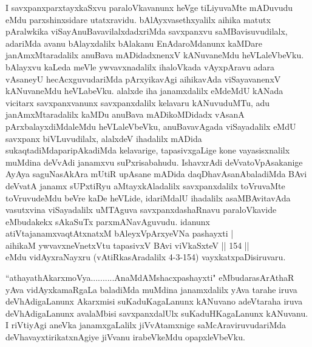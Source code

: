 \begin{artha}
I savxpanxparxtayxkaSxvu paraloVkavanunx heVge tiLiyuvaMte mADuvudu eMdu parxshinxsidare utatxravidu. bAlAyxvasethxyalilx aihika matutx pAralwkika viSayAnuBavavilalxdadxriMda savxpanxvu saMBavisuvudilalx, adariMda avanu bAlayxdalilx bAlakanu EnAdaroMdanunx kaMDare janAmxMtaradalilx anuBava mADidadxnenxV kANuvaneMdu heVLaleVbeVku. bAlayxvu kaLeda meVle ywvavxnadalilx ihaloVkada vAyxpAravu adara vAsaneyU hecAcxguvudariMda pArxyikavAgi aihikavAda viSayavanenxV kANuvaneMdu heVLabeVku. alalxde iha janamxdalilx eMdeMdU kANada vicitarx savxpanxvanunx savxpanxdalilx kelavaru kANuvuduMTu, adu janAmxMtaradalilx kaMDu anuBava mADikoMDidadx vAsanA pArxbalayx\-diMdaleMdu heVLaleVbeVku, anuBavavAgada viSayadalilx eMdU savxpanx biVLuvudilalx, alalxdeV ihadalilx mADida sukaqtadiMda\break paripAkadiMda kelavarige, tapasivxgaLige kone vayasisxnalilx muMdina deVvAdi janamxvu suPxrisabahudu. IshavxrAdi deVvatoVpAsakanige AyAya saguNasAkAra mUtiR upAsane mADida daqDhavAsanAbaladiMda BAvi deVvatA janamx sUPxtiRyu aMtayxkAladalilx savxpanxdalilx toVruvaMte toVruvudeMdu beVre kaDe heVLide, idariMdalU ihadalilx asaMBAvitavAda vasutxvina viSayadalilx uMTAguva savxpanxdashaRnavu paraloVkavide eMbudakekx sAkaSuTx parxmANavAguvudu. idanunx\\ atiVtajanamxvaqtAtxnatxM bAleyxVpArxyeVNa pashayxti |\\
aihikaM ywvavxneV\s netxVtu tapasivxV BAvi viVkaSxteV || 154 ||\\ eMdu vidAyxraNayxru (vAtiRkasAradalilx 4-3-154) vayxkatx\-\break paDisiruvaru.
\end{artha}%


\begin{artha}
``athayathAkarxmoVya..........AnaMdAMshacxpashayxti" eMbudara\break sArAthaR yAva vidAyxkamaRgaLa baladiMda muMdina janamxdalilx yAva tarahe iruva deVhAdigaLanunx Akarxmisi suKaduKagaLanunx kANuvano adeVtaraha iruva deVhAdigaLanunx avalaMbisi savxpanxdalUlx suKaduHKagaLanunx kANuvanu. I riVtiyAgi aneVka janamxgaLalilx jiVvAtamxnige saMcAraviruvudariMda deVhavayxtirikatxnAgiye jiVvanu irabeVkeMdu opapxleVbeVku.
\end{artha}


